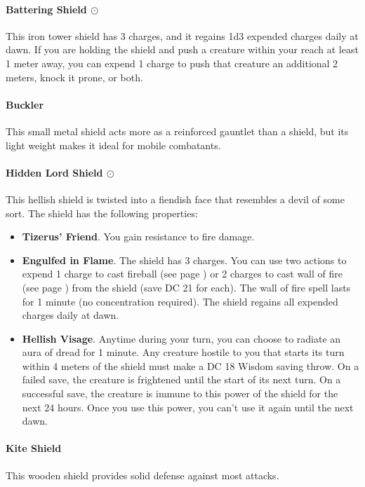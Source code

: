     \paragraph{Battering Shield $\odot$}
        This iron tower shield has 3 charges, and it regains 1d3 expended charges daily at dawn.
        If you are holding the shield and push a creature within your reach at least 1 meter away, you can expend 1 charge to push that creature an additional 2 meters, knock it prone, or both.
    \paragraph{Buckler}
        This small metal shield acts more as a reinforced gauntlet than a shield, but its light weight makes it ideal for mobile combatants.
    \paragraph{Hidden Lord Shield $\odot$}
        This hellish shield is twisted into a fiendish face that resembles a devil of some sort.
        The shield has the following properties:
        \begin{itemize}
            \item \textbf{Tizerus' Friend}.
            You gain resistance to fire damage.
            \item \textbf{Engulfed in Flame}.
            The shield has 3 charges.
            You can use two actions to expend 1 charge to cast fireball (see page \pageref{spell:fireball}) or 2 charges to cast wall of fire (see page \pageref{spell:walloffire}) from the shield (save DC 21 for each).
            The wall of fire spell lasts for 1 minute (no concentration required).
            The shield regains all expended charges daily at dawn.
            \item \textbf{Hellish Visage}.
            Anytime during your turn, you can choose to radiate an aura of dread for 1 minute.
            Any creature hostile to you that starts its turn within 4 meters of the shield must make a DC 18 Wisdom saving throw.
            On a failed save, the creature is frightened until the start of its next turn.
            On a successful save, the creature is immune to this power of the shield for the next 24 hours.
            Once you use this power, you can't use it again until the next dawn.
        \end{itemize}
    \paragraph{Kite Shield}
        This wooden shield provides solid defense against most attacks.

